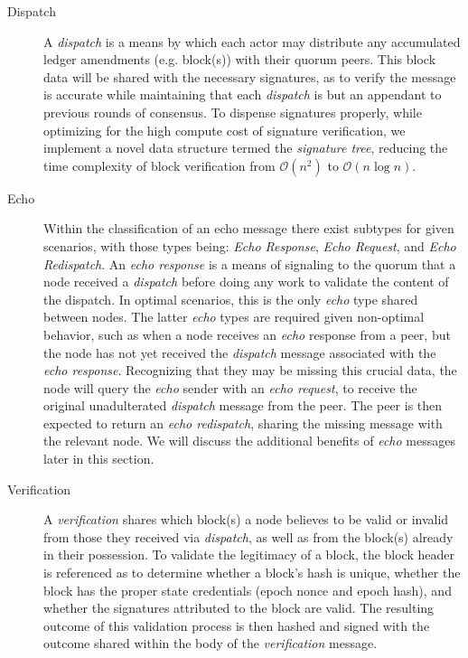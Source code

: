 \begin{description}
    \item[Dispatch] A \textit{dispatch} is a means by which each actor may distribute any accumulated ledger amendments (e.g. block(s)) with their quorum peers. This block data will be shared with the necessary signatures, as to verify the message is accurate while maintaining that each \textit{dispatch} is but an appendant to previous rounds of consensus. To dispense signatures properly, while optimizing for the high compute cost of signature verification, we implement a novel data structure termed the \textit{signature tree}, reducing the time complexity of block verification from \(\mathcal{O}(n^2)\) to \(\mathcal{O}(n\log n)\).
    \item[Echo] Within the classification of an echo message there exist subtypes for given scenarios, with those types being: \textit{Echo Response}, \textit{Echo Request}, and \textit{Echo Redispatch}.
    An \textit{echo response} is a means of signaling to the quorum that a node received a \textit{dispatch} before doing any work to validate the content of the dispatch. In optimal scenarios, this is the only \textit{echo} type shared between nodes. The latter \textit{echo} types are required given non-optimal behavior, such as when a node receives an \textit{echo} response from a peer, but the node has not yet received the \textit{dispatch} message associated with the \textit{echo response}. Recognizing that they may be missing this crucial data, the node will query the \textit{echo} sender with an \textit{echo request}, to receive the original unadulterated \textit{dispatch} message from the peer. The peer is then expected to return an \textit{echo redispatch}, sharing the missing message with the relevant node. We will discuss the additional benefits of \textit{echo} messages later in this section.


    \item[Verification] A \textit{verification} shares which block(s) a node believes to be valid or invalid from those they received via \textit{dispatch}, as well as from the block(s) already in their possession. To validate the legitimacy of a block, the block header is referenced as to determine whether a block’s hash is unique, whether the block has the proper state credentials (epoch nonce and epoch hash), and whether the signatures attributed to the block are valid. The resulting outcome of this validation process is then hashed and signed with the outcome shared within the body of the \textit{verification} message.


\end{description}
